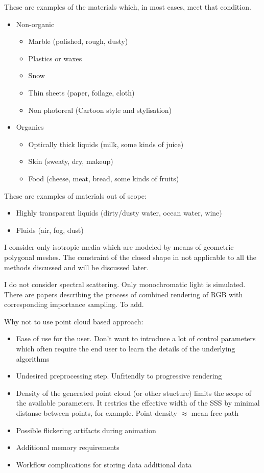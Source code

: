 These are examples of the materials which, in most cases, meet that condition.
\begin{itemize}
    \item Non-organic
    \begin{itemize}
        \item Marble (polished, rough, dusty)
        \item Plastics or waxes
        \item Snow
        \item Thin sheets (paper, foilage, cloth)
        \item Non photoreal (Cartoon style and stylisation)
    \end{itemize}
    \item Organics
    \begin{itemize}
    \item Optically thick liquids (milk, some kinds of juice)
        \item Skin (sweaty, dry, makeup)
        \item Food (cheese, meat, bread, some kinds of fruits)
    \end{itemize}
\end{itemize}
These are examples of materials out of scope:
\begin{itemize}
    \item Highly transparent liquids (dirty/dusty water, ocean water, wine)
    \item Fluids (air, fog, dust)
\end{itemize}
I consider only isotropic media which are modeled by means of geometric
polygonal meshes. The constraint of the closed shape in not applicable to all
the methods discussed and will be discussed later.

I do not consider spectral scattering. Only monochromatic light is simulated.
There are papers describing the process of combined rendering of RGB with
corresponding importance sampling. To add.

Why not to use point cloud based approach:
\begin{itemize}
    \item{Ease of use for the user. Don't want to introduce a lot of control
    parameters which often require the end user to learn the details of the
    underlying algorithms}
    \item{Undesired preprocessing step. Unfriendly to progressive rendering}
    \item{Density of the generated point cloud (or other stucture) limits the
    scope of the available parameters. It restrics the effective width of the
    SSS by minimal distanse between points, for example. Point density $\approx$
    mean free path}
    \item{Possible flickering artifacts during animation}
    \item{Additional memory requirements}
    \item{Workflow complications for storing data additional data}
\end{itemize}

